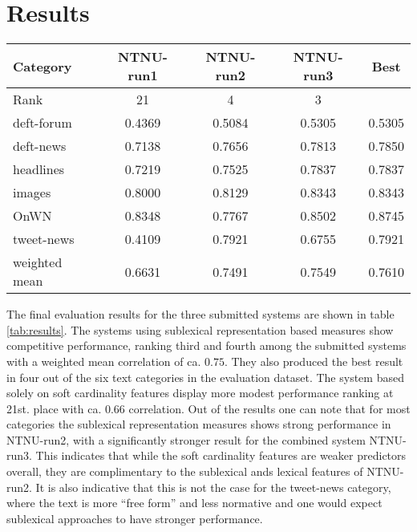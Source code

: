 
\section{Results}
\label{sec:results}

\begin{table*}
  \centering
  \begin{tabular}{|l|c|c|c|c|}
    \hline
    Category & NTNU-run1 & NTNU-run2 & NTNU-run3 & Best \\
    \hline
    Rank & 21 & 4 & 3 & \\
    \hline
    deft-forum & 0.4369 & 0.5084 & 0.5305 & 0.5305 \\
    deft-news & 0.7138 & 0.7656 & 0.7813 & 0.7850 \\
    headlines & 0.7219 & 0.7525 & 0.7837 & 0.7837 \\
    images & 0.8000 & 0.8129 & 0.8343 & 0.8343 \\
    OnWN & 0.8348 & 0.7767 & 0.8502 & 0.8745 \\
    tweet-news & 0.4109 & 0.7921 & 0.6755	& 0.7921 \\
    \hline
    weighted mean & 0.6631 & 0.7491 & 0.7549 & 0.7610 \\
    \hline
  \end{tabular}
  \caption{Final evaluation results for the submitted systems.}
  \label{tab:results}
\end{table*}

The final evaluation results for the three submitted systems are shown in table \ref{tab:results}. The systems using sublexical representation based measures show competitive performance, ranking third and fourth among the submitted systems with a weighted mean correlation of ca. $0.75$. They also produced the best result in four out of the six text categories in the evaluation dataset. The system based solely on soft cardinality features display more modest performance ranking at 21st. place with ca. 0.66 correlation. Out of the results one can note that for most categories the sublexical representation measures shows strong performance in NTNU-run2, with a significantly stronger result for the combined system NTNU-run3. This indicates that while the soft cardinality features are weaker predictors overall, they are complimentary to the sublexical ands lexical features of NTNU-run2. It is also indicative that this is not the case for the tweet-news category, where the text is more ``free form'' and less normative and one would expect sublexical approaches to have stronger performance.

